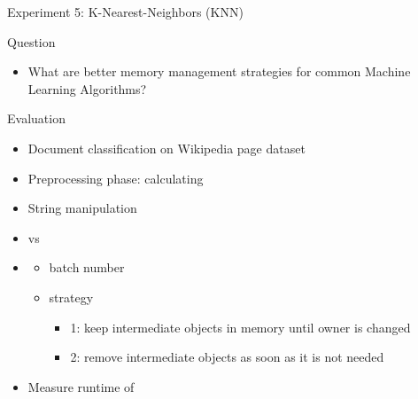 \documentclass[9pt]{beamer}
\begin{document}

\begin{frame}[fragile]{Experiment 5: K-Nearest-Neighbors (KNN)}
    
    Question
    \begin{itemize}
        \item What are better memory management strategies for common Machine Learning Algorithms?
    \end{itemize} 

    Evaluation
    \begin{itemize}
        \item Document classification on Wikipedia page dataset
        \item Preprocessing phase: calculating 
        \item String manipulation
        \item {} vs 
        \item {}
        \begin{itemize}
            \item batch number
            \item strategy
            \begin{itemize}
                \item 1: keep intermediate objects in memory until owner is changed
                \item 2: remove intermediate objects as soon as it is not needed 
            \end{itemize}  
        \end{itemize}
        \item Measure runtime of 
    \end{itemize}
\end{frame}

\end{document}
